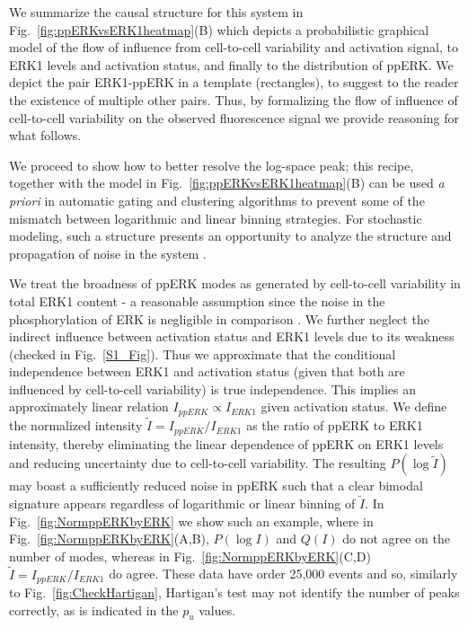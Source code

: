 \documentclass[11pt,a4paper,draft]{article}
\begin{document}
We summarize the causal structure for this system in Fig.~\ref{fig:ppERKvsERK1heatmap}(B) which depicts a probabilistic graphical model \cite{Koller2009} of the flow of influence from cell-to-cell variability and activation signal, to ERK1 levels and activation status, and finally to the distribution of ppERK. We depict the pair ERK1-ppERK in a template (rectangles), to suggest to the reader the existence of multiple other pairs. Thus, by formalizing the flow of influence of cell-to-cell variability on the observed fluorescence signal we provide reasoning for what follows.
\smallskip

We proceed to show how to better resolve the log-space peak; this recipe, together with the model in Fig.~\ref{fig:ppERKvsERK1heatmap}(B) can be used \emph{a priori} in automatic gating and clustering algorithms to prevent some of the mismatch between logarithmic and linear binning strategies. For stochastic modeling, such a structure presents an opportunity to analyze the structure and propagation of noise in the system \cite{Prill2015,Ching2017}.
\smallskip

We treat the broadness of ppERK modes as generated by cell-to-cell variability in total ERK1 content - a reasonable assumption since the noise in the phosphorylation of ERK is negligible in comparison \cite{Filippi2016}. We further neglect the indirect influence between activation status and ERK1 levels due to its weakness (checked in Fig.~\ref{S1_Fig}). Thus we approximate that the conditional independence between ERK1 and activation status (given that both are influenced by cell-to-cell variability) is true independence. This implies an approximately linear relation $I_{ppERK} \propto I_{ERK1}$ given activation status.
We define the normalized intensity $\tilde{I} = I_{ppERK}/I_{ERK1}$ as the ratio of ppERK to ERK1 intensity, thereby eliminating the linear dependence of ppERK on ERK1 levels and reducing uncertainty due to cell-to-cell variability. The resulting $P(\log \tilde{I})$ may boast a sufficiently reduced noise in ppERK such that a clear bimodal signature appears regardless of logarithmic or linear binning of $\tilde{I}$. In Fig.~\ref{fig:NormppERKbyERK} we show such an example, where in Fig.~\ref{fig:NormppERKbyERK}(A,B), $P(\log I)$ and $Q(I)$ do not agree on the number of modes, whereas in Fig.~\ref{fig:NormppERKbyERK}(C,D) $\tilde{I} = I_{ppERK} / I_{ERK1}$ do agree. These data have order 25,000 events and so, similarly to Fig.~\ref{fig:CheckHartigan}, Hartigan's test may not identify the number of peaks correctly, as is indicated in the $p_u$ values.
\end{document}
